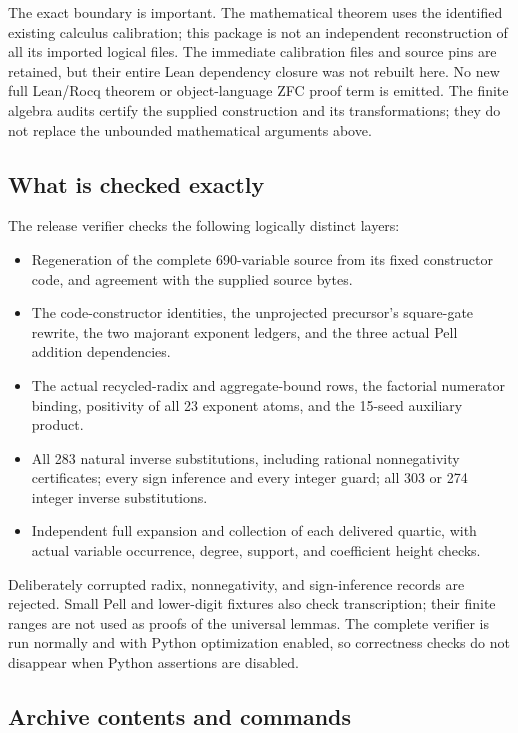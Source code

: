 \documentclass[10pt,letterpaper]{article}
\theoremstyle{definition}\newtheorem{definition}[theorem]{Definition}
\theoremstyle{remark}\newtheorem{remark}[theorem]{Remark}
\begin{document}
The exact boundary is important. The mathematical theorem uses the
identified existing calculus calibration; this package is not an
independent reconstruction of all its imported logical files. The immediate
calibration files and source pins are retained, but their entire Lean
dependency closure was not rebuilt here. No new full Lean/Rocq theorem
or object-language ZFC proof term is emitted. The finite algebra audits
certify the supplied construction and its transformations; they do not
replace the unbounded mathematical arguments above.

\subsection{What is checked exactly}

The release verifier checks the following logically distinct layers:
\begin{itemize}
\item Regeneration of the complete 690-variable source from its fixed
      constructor code, and agreement with the supplied source bytes.
\item The code-constructor identities, the unprojected precursor's
      square-gate rewrite,
      the two majorant exponent ledgers, and the three actual Pell
      addition dependencies.
\item The actual recycled-radix and aggregate-bound rows, the factorial
      numerator binding, positivity of all 23 exponent atoms, and the
      15-seed auxiliary product.
\item All 283 natural inverse substitutions, including rational
      nonnegativity certificates; every sign inference and every integer
      guard; all 303 or 274 integer inverse substitutions.
\item Independent full expansion and collection of each delivered quartic,
      with actual variable occurrence, degree, support, and coefficient
      height checks.
\end{itemize}
Deliberately corrupted radix, nonnegativity, and sign-inference records
are rejected. Small Pell and lower-digit fixtures also check transcription;
their finite ranges are not used as proofs of the universal lemmas.
The complete verifier is run normally and with Python optimization enabled,
so correctness checks do not disappear when Python assertions are disabled.

\subsection{Archive contents and commands}
\end{document}
